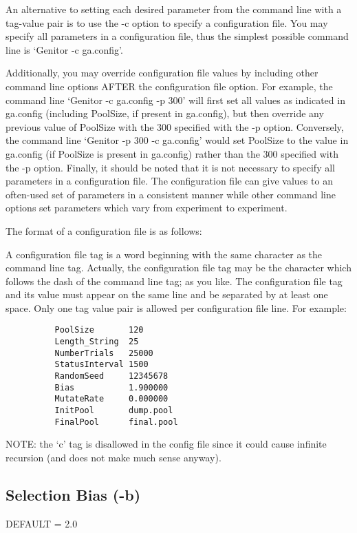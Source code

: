 An alternative to setting each desired parameter from the command line with
a tag-value pair is to use the -c option to specify a configuration file.  
You may specify all parameters in a configuration file, thus the simplest
possible command line is `Genitor -c ga.config'.  

Additionally, you may override configuration file values by including other
command line options AFTER the configuration file option.  For example, the
command line `Genitor -c ga.config -p 300' will first set all values as indicated
in ga.config (including PoolSize, if present in ga.config), but then override
any previous value of PoolSize with the 300 specified with the -p option.  
Conversely, the command line `Genitor -p 300 -c ga.config' would set PoolSize 
to the value in ga.config (if PoolSize is present in ga.config) rather than
the 300 specified with the -p option.  Finally, it should be noted that it is
not necessary to specify all parameters in a configuration file.  The 
configuration file can give values to an often-used set of parameters in a
consistent manner while other command line options set parameters which vary
from experiment to experiment.

The format of a configuration file is as follows:

A configuration file tag is a word beginning with the same character as the
command line tag. Actually, the configuration file tag may be the character which
follows the dash of the command line tag; as you like. The configuration file tag
and its value must appear on the same line and be separated by at least one space.
Only one tag value pair is allowed per configuration file line.  For example:

\begin{verbatim}
          PoolSize       120
          Length_String  25
          NumberTrials   25000
          StatusInterval 1500
          RandomSeed     12345678
          Bias           1.900000
          MutateRate     0.000000
          InitPool       dump.pool
          FinalPool      final.pool
\end{verbatim}



NOTE: the `c' tag is disallowed in the config file since it could cause infinite 
recursion (and does not make much sense anyway).



\subsection*{Selection Bias (-b)}
DEFAULT = 2.0

